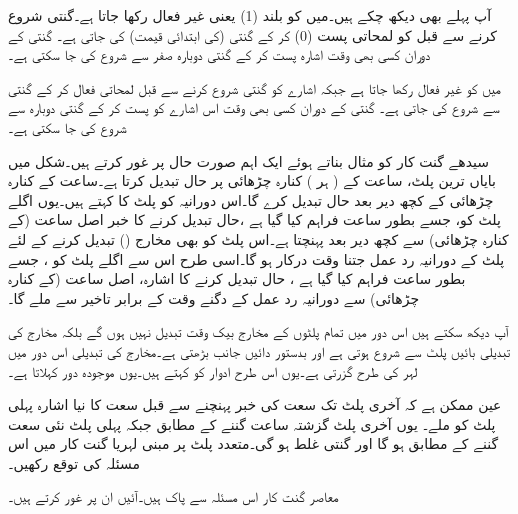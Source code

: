  آپ پہلے بھی دیکھ چکے ہیں۔میں 
 کو بلند (1) یعنی غیر فعال رکھا جاتا ہے۔گنتی شروع کرنے سے قبل  کو لمحاتی پست (0) کر کے گنتی (کی ابتدائی قیمت)  کی جاتی ہے۔ گنتی کے دوران کسی بھی وقت  اشارہ پست کر کے گنتی دوبارہ صفر سے شروع کی جا سکتی ہے۔

 میں  کو غیر فعال رکھا جاتا ہے جبکہ  اشارے کو گنتی شروع کرنے سے قبل لمحاتی فعال کر کے گنتی  سے شروع کی جاتی ہے۔ گنتی کے دوران کسی بھی وقت اس اشارے کو پست کر کے گنتی دوبارہ  سے شروع کی جا سکتی ہے۔

سیدھے گنت کار کو مثال بناتے ہوئے ایک اہم صورت حال پر غور کرتے ہیں۔شکل میں بایاں ترین پلٹ، ساعت کے ( ہر ) کنارہ چڑھائی پر حال تبدیل کرتا ہے۔ساعت کے کنارہ چڑھائی کے کچھ دیر بعد 
 حال تبدیل کرے گا۔اس دورانیہ کو پلٹ کا کہتے ہیں۔یوں اگلے پلٹ کو، جسے  بطور ساعت فراہم کیا گیا ہے ،حال تبدیل کرنے کا خبر اصل ساعت (کے کنارہ چڑھائی) سے کچھ دیر بعد پہنچتا ہے۔اس پلٹ کو بھی مخارج () تبدیل کرنے کے لئے پلٹ کے دورانیہ رد عمل جتنا وقت درکار ہو گا۔اسی طرح اس سے اگلے پلٹ کو ، جسے  بطور ساعت فراہم کیا گیا ہے ، حال تبدیل کرنے کا اشارہ، اصل ساعت (کے کنارہ چڑھائی) سے دورانیہ رد عمل کے دگنے وقت کے برابر تاخیر سے ملے گا۔

آپ دیکھ سکتے ہیں اس دور میں تمام پلٹوں کے مخارج بیک وقت تبدیل نہیں ہوں گے بلکہ مخارج کی تبدیلی بائیں پلٹ سے شروع ہوتی ہے اور بدستور دائیں جانب بڑھتی ہے۔مخارج کی تبدیلی اس دور میں لہر کی طرح گزرتی ہے۔یوں اس طرح ادوار کو  کہتے ہیں۔یوں موجودہ دور کہلاتا ہے۔

عین ممکن ہے کہ آخری پلٹ تک سعت کی خبر پہنچنے سے قبل سعت کا نیا اشارہ پہلی پلٹ کو ملے۔ یوں آخری پلٹ گزشتہ ساعت گننے کے مطابق جبکہ پہلی پلٹ نئی سعت گننے کے مطابق ہو گا اور گنتی غلط ہو گی۔متعدد پلٹ پر مبنی لہریا گنت کار میں اس مسئلہ کی توقع رکھیں۔ 

 معاصر گنت کار اس مسئلہ سے پاک ہیں۔آئیں ان پر غور کرتے ہیں۔
 
